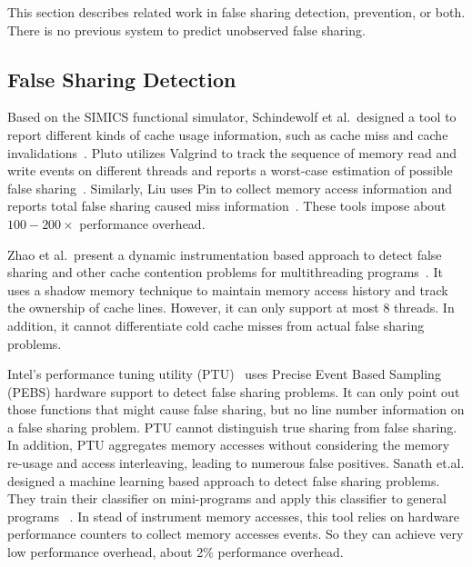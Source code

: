 \label{sec:relatedwork}

This section describes related work in false sharing detection, prevention, or both. There is no previous
system to predict unobserved false sharing.

\subsection{False Sharing Detection}
Based on the SIMICS functional simulator, Schindewolf et al.\ designed a tool to report different kinds of cache usage information, such as cache miss and cache invalidations~\cite{falseshare:simulator}. Pluto utilizes Valgrind to track the sequence of memory read and write events on different threads and reports a worst-case estimation of possible false sharing~\cite{falseshare:binaryinstrumentation1}.
Similarly, Liu uses Pin to collect memory access information and reports total false sharing caused miss information~\cite{falseshare:binaryinstrumentation2}.
These tools impose about $100-200\times$ performance overhead.

Zhao et al.\ present a dynamic instrumentation based approach to detect false sharing and other cache contention problems
for multithreading programs~\cite{qinzhaodetection}. 
It uses a shadow memory technique to maintain memory access history and track the ownership of cache lines. 
However, it can only support at most $8$ threads. In addition, it cannot differentiate cold cache misses from actual false sharing problems.

Intel's performance tuning utility (PTU)~\cite{detect:ptu, detect:intel} uses Precise Event Based Sampling (PEBS) hardware support to detect false sharing problems.  It can only point out those functions that might cause false sharing, but no line number information on a false sharing problem.  PTU cannot distinguish true sharing from false sharing. In addition, PTU aggregates memory accesses without considering the memory re-usage and access interleaving, leading to numerous false positives. Sanath et.al. designed a machine learning based approach to detect false sharing problems. They train their classifier on mini-programs and apply this classifier to general programs ~\cite{mldetect}. 
In stead of instrument memory accesses, this tool relies on hardware performance counters to collect memory accesses events. So they can achieve very low performance overhead, about 2\% performance overhead. 

